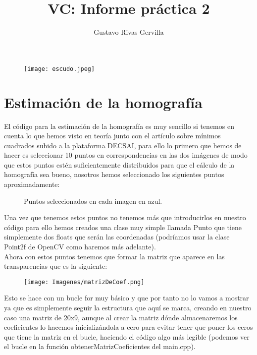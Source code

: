 \documentclass[10pt,a4paper]{article}
\author{Gustavo Rivas Gervilla}
\title{\textbf{VC: Informe práctica 2}}
\date{}
\begin{document}
\maketitle

\begin{figure}[H]
\centering
\texttt{[image: escudo.jpeg]}
\end{figure}

\newpage


\section{Estimación de la homografía}

El código para la estimación de la homografía es muy sencillo si tenemos en cuenta lo que hemos visto en teoría junto con el artículo sobre mínimos cuadrados subido a la plataforma DECSAI, para ello lo primero que hemos de hacer es seleccionar 10 puntos en correspondencias en las dos imágenes de modo que estos puntos estén suficientemente distribuidos para que el cálculo de la homografía sea bueno, nosotros hemos seleccionado los siguientes puntos aproximadamente:\\

\begin{figure}[H]
\centering
{}
\caption{Puntos seleccionados en cada imagen en azul.}
\end{figure}

Una vez que tenemos estos puntos no tenemos más que introducirlos en nuestro código para ello hemos creados una clase muy simple llamada Punto que tiene simplemente dos floats que serán las coordenadas (podríamos usar la clase Point2f de OpenCV como haremos más adelante).\\

Ahora con estos puntos tenemos que formar la matriz que aparece en las transparencias que es la siguiente:\\

\begin{figure}[H]
\centering
\texttt{[image: Imagenes/matrizDeCoef.png]}
\end{figure}

Esto se hace con un bucle for muy básico y que por tanto no lo vamos a mostrar ya que es simplemente seguir la estructura que aquí se marca, creando en nuestro caso una matriz de 20x9, aunque al crear la matriz dónde almacenaremos los coeficientes lo hacemos inicializándola a cero para evitar tener que poner los ceros que tiene la matriz en el bucle, haciendo el código algo más legible (podemos ver el bucle en la función obtenerMatrizCoeficientes del main.cpp).\\
\end{document}
